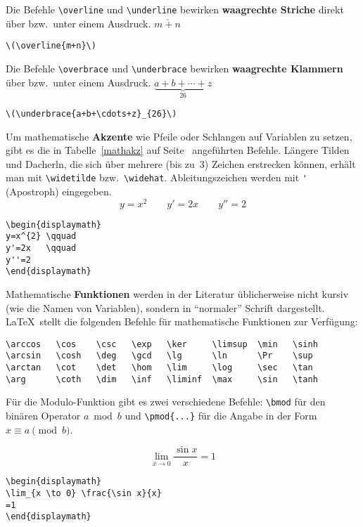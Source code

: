 Die Befehle \verb|\overline| und \verb|\underline| bewirken
\textbf{waagrechte Striche} direkt über bzw.\ unter einem
Ausdruck.
\exa
\(\overline{m+n}\)
\exb
\begin{verbatim}
\(\overline{m+n}\)
\end{verbatim}
\exc
 
Die Befehle \verb|\overbrace| und \verb|\underbrace| bewirken
\textbf{waagrechte Klammern} über bzw.\ unter einem Ausdruck.
\exa
\(\underbrace{a+b+\cdots+z}_{26}\)
\exb
\begin{verbatim}
\(\underbrace{a+b+\cdots+z}_{26}\)
\end{verbatim}
\exc
 
Um mathematische \textbf{Akzente} wie Pfeile oder Schlangen auf
Variablen zu setzen, gibt es die in Tabelle~\ref{mathakz} auf
Seite~\pageref{mathakz} angeführten Befehle.
Längere Tilden und Dacherln, die sich über mehrere (bis zu~3)
Zeichen erstrecken können, erhält man mit \verb|\widetilde|
bzw.\ \verb|\widehat|.
Ableitungszeichen werden mit \verb|'| (Apostroph) eingegeben.
\exa
\begin{displaymath}
y=x^{2} \qquad
y'=2x   \qquad
y''=2
\end{displaymath}
\exb
\begin{verbatim}
\begin{displaymath}
y=x^{2} \qquad
y'=2x   \qquad
y''=2
\end{displaymath}
\end{verbatim}
\exc
 
Mathematische \textbf{Funktionen} werden in der Literatur
üblicherweise nicht kursiv (wie die Namen von Variablen),
sondern in "`normaler"' Schrift dargestellt.
\LaTeX\ stellt die folgenden Befehle für mathematische
Funktionen zur Verfügung:
\begin{verbatim}
\arccos   \cos    \csc   \exp   \ker     \limsup  \min   \sinh
\arcsin   \cosh   \deg   \gcd   \lg      \ln      \Pr    \sup
\arctan   \cot    \det   \hom   \lim     \log     \sec   \tan
\arg      \coth   \dim   \inf   \liminf  \max     \sin   \tanh
\end{verbatim}
Für die Modulo-Funktion gibt es zwei verschiedene Befehle:
\verb|\bmod| für den binären Operator \(a \bmod b\) und
\verb|\pmod{...}| für die Angabe in der Form \(x\equiv a
\pmod{b}\).
 
\exa
\begin{displaymath}
\lim_{x \to 0} \frac{\sin x}{x}
=1
\end{displaymath}
\exb
\begin{verbatim}
\begin{displaymath}
\lim_{x \to 0} \frac{\sin x}{x}
=1
\end{displaymath}
\end{verbatim}
\exc
 
